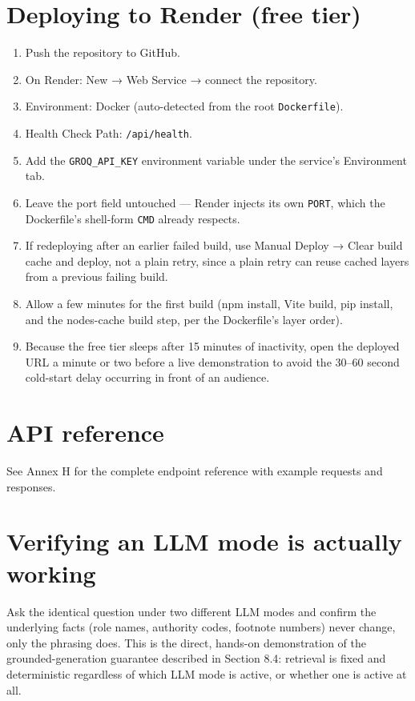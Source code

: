 \section{Deploying to Render (free tier)}
\begin{enumerate}
\item Push the repository to GitHub.
\item On Render: New → Web Service → connect the repository.
\item Environment: Docker (auto-detected from the root \texttt{Dockerfile}).
\item Health Check Path: \texttt{/\allowbreak{}api/\allowbreak{}health}.
\item Add the \texttt{GROQ\_\allowbreak{}API\_\allowbreak{}KEY} environment variable under the service's Environment tab.
\item Leave the port field untouched — Render injects its own \texttt{PORT}, which the Dockerfile's shell-form \texttt{CMD} already respects.
\item If redeploying after an earlier failed build, use Manual Deploy → Clear build cache and deploy, not a plain retry, since a plain retry can reuse cached layers from a previous failing build.
\item Allow a few minutes for the first build (npm install, Vite build, pip install, and the nodes-cache build step, per the Dockerfile's layer order).
\item Because the free tier sleeps after 15 minutes of inactivity, open the deployed URL a minute or two before a live demonstration to avoid the 30–60 second cold-start delay occurring in front of an audience.
\end{enumerate}
\section{API reference}
See Annex H for the complete endpoint reference with example requests and responses.

\section{Verifying an LLM mode is actually working}
Ask the identical question under two different LLM modes and confirm the underlying facts (role names, authority codes, footnote numbers) never change, only the phrasing does. This is the direct, hands-on demonstration of the grounded-generation guarantee described in Section 8.4: retrieval is fixed and deterministic regardless of which LLM mode is active, or whether one is active at all.

